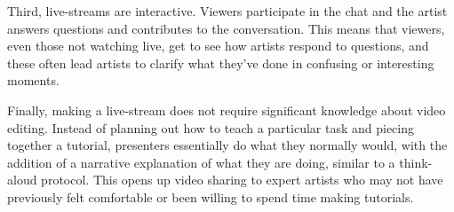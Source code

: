 Third, live-streams are interactive. Viewers participate in the chat \cite{Pan2016, Hamilton2014} and the artist answers questions and contributes to the conversation. This means that viewers, even those not watching live, get to see how artists respond to questions, and these often lead artists to clarify what they've done in confusing or interesting moments.

Finally, making a live-stream does not require significant knowledge about video editing. Instead of planning out how to teach a particular task and piecing together a tutorial, presenters essentially do what they normally would, with the addition of a narrative explanation of what they are doing, similar to a think-aloud protocol. This opens up video sharing to expert artists who may not have previously felt comfortable or been willing to spend time making tutorials.
